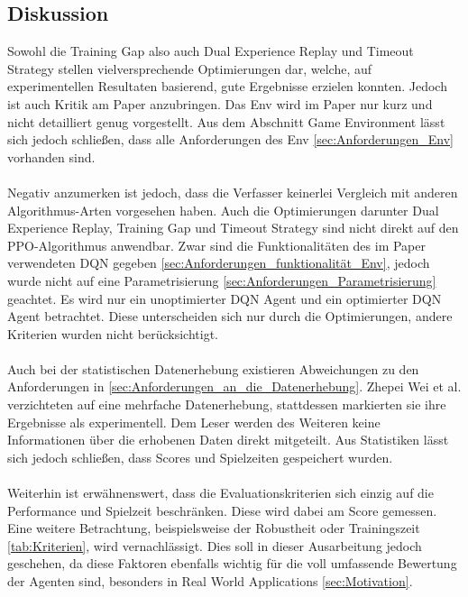 \subsection{Diskussion} \label{sec:Paper_1_Diskussion}
Sowohl die Training Gap also auch Dual Experience Replay und Timeout Strategy stellen vielversprechende Optimierungen dar, welche, auf experimentellen Resultaten basierend, gute Ergebnisse erzielen konnten. Jedoch ist auch Kritik am Paper anzubringen.
Das Env wird im Paper nur kurz und nicht detailliert genug vorgestellt. Aus dem Abschnitt Game Environment lässt sich jedoch schließen, dass alle Anforderungen des Env \ref{sec:Anforderungen_Env} vorhanden sind.\\
\\ Negativ anzumerken ist jedoch, dass die Verfasser keinerlei Vergleich mit anderen Algorithmus-Arten vorgesehen haben. Auch die Optimierungen darunter Dual Experience Replay, Training Gap und Timeout Strategy sind nicht direkt auf den PPO-Algorithmus anwendbar. 
Zwar sind die Funktionalitäten des im Paper verwendeten DQN gegeben \ref{sec:Anforderungen_funktionalität_Env}, jedoch wurde nicht auf eine Parametrisierung \ref{sec:Anforderungen_Parametrisierung} geachtet. Es wird nur ein unoptimierter DQN Agent und ein optimierter DQN Agent betrachtet. Diese unterscheiden sich nur durch die Optimierungen, andere Kriterien wurden nicht berücksichtigt.\\
\\Auch bei der statistischen Datenerhebung existieren Abweichungen zu den Anforderungen in \ref{sec:Anforderungen_an_die_Datenerhebung}. Zhepei Wei et al. verzichteten auf eine mehrfache Datenerhebung, stattdessen markierten sie ihre Ergebnisse als experimentell. Dem Leser werden des Weiteren keine Informationen über die erhobenen Daten direkt mitgeteilt. Aus Statistiken lässt sich jedoch schließen, dass Scores und Spielzeiten gespeichert wurden.\\
\\Weiterhin ist erwähnenswert, dass die Evaluationskriterien sich einzig auf die Performance und Spielzeit beschränken. Diese wird dabei am Score gemessen.\\
Eine weitere Betrachtung, beispielsweise der Robustheit oder Trainingszeit \ref{tab:Kriterien}, wird vernachlässigt. Dies soll in dieser Ausarbeitung jedoch geschehen, da diese Faktoren ebenfalls wichtig für die voll umfassende Bewertung der Agenten sind, besonders in Real World Applications \ref{sec:Motivation}.


